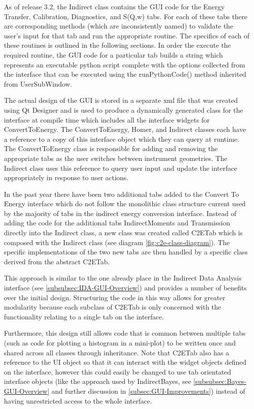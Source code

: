 \documentclass[paper=a4, fontsize=11pt]{scrartcl}	%
\numberwithin{equation}{section}															%
\numberwithin{figure}{section}																%
\numberwithin{table}{section}																%
\begin{document}
As of release 3.2, the Indirect class contains the GUI code for the Energy Transfer, Calibration, Diagnostics, and S(Q,w) tabs. For each of these tabs there are corresponding methods (which are inconsistently named) to validate the user's input for that tab and run the appropriate routine. The specifics of each of these routines is outlined in the following sections. In order the execute the required routine, the GUI code for a particular tab builds a string which represents an executable python script complete with the options collected from the interface that can be executed using the runPythonCode() method inherited from UserSubWindow.

The actual design of the GUI is stored in a separate xml file that was created using Qt Designer and is used to produce a dynamically generated class for the interface at compile time which includes all the interface widgets for ConvertToEnergy. The ConvertToEnergy, Homer, and Indirect classes each have a reference to a copy of this interface object which they can query at runtime. The ConvertToEnergy class is responsible for adding and removing the appropriate tabs as the user switches between instrument geometries. The Indirect class uses this reference to query user input and update the interface appropriately in response to user actions.

In the past year there have been two additional tabs added to the Convert To Energy interface which do not follow the monolithic class structure current used by the majority of tabs in the indirect energy conversion interface. Instead of adding the code for the additional tabs IndirectMoments and Transmission directly into the Indirect class, a new class was created called C2ETab which is composed with the Indirect class (see diagram \ref{fig:c2e-class-diagram}). The specific implementations of the two new tabs are then handled by a specific class derived from the abstract C2ETab.

This approach is similar to the one already place in the Indirect Data Analysis interface (see \ref{subsubsec:IDA-GUI-Overview}) and provides a number of benefits over the initial design. Structuring the code in this way allows for greater modularity because each subclass of C2ETab is only concerned with the functionality relating to a single tab on the interface.

Furthermore, this design still allows code that is common between multiple tabs (such as code for plotting a histogram in a mini-plot) to be written once and shared across all classes through inheritance. Note that C2ETab also has a reference to the UI object so that it can interact with the widget objects defined on the interface, however this could easily be changed to use tab orientated interface objects (like the approach used by IndirectBayes, see \ref{subsubsec:Bayes-GUI-Overview} and further discussion in \ref{subsec:GUI-Improvements}) instead of having unrestricted access to the whole interface.
\end{document}
